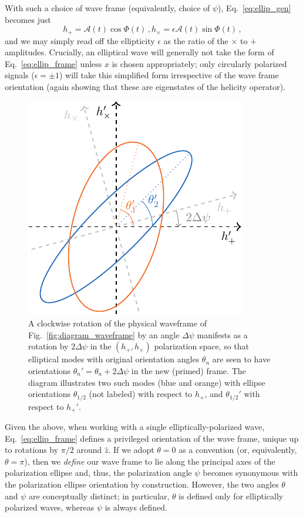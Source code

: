 \documentclass[aps,prd,twocolumn,superscriptaddress,preprintnumbers,floatfix,nofootinbib]{revtex4-2}
\newcommand{\beq}{\begin{equation}}
\newcommand{\eeq}{\end{equation}}
\newcommand*{\eq}[1]{Eq.~\eqref{eq:#1}}
\begin{document}
With such a choice of wave frame (equivalently, choice of $\psi$), \eq{ellip_gen} becomes just
\begin{subequations} \label{eq:ellip_frame}
\beq
h_+ = \mathcal{A}(t) \cos \Phi(t) \, ,
\eeq
\beq
h_\times = \epsilon \mathcal{A}(t) \sin \Phi(t)\, ,
\eeq
\end{subequations}
and we may simply read off the ellipticity $\epsilon$ as the ratio of the $\times$ to $+$ amplitudes.
Crucially, an elliptical wave will generally not take the form of Eq.~\eqref{eq:ellip_frame} unless $\hat{x}$ is chosen appropriately; only circularly polarized signals ($\epsilon=\pm1$) will take  this simplified form irrespective of the wave frame orientation (again showing that these are eigenstates of the helicity operator).

\begin{figure}[tbp]
\includegraphics[width=0.65\columnwidth]{diagram_ellipse_extra.pdf}
\caption{A clockwise rotation of the physical waveframe of Fig.~\ref{fig:diagram_waveframe} by an angle $\Delta\psi$ manifests as a rotation by $2\Delta\psi$ in the $(h_+,h_\times)$ polarization space, so that elliptical modes with original orientation angles $\theta_n$ are seen to have orientations $\theta_n'=\theta_n + 2\Delta\psi$ in the new (primed) frame.
The diagram illustrates two such modes (blue and orange) with ellipse orientations $\theta_{1/2}$ (not labeled) with respect to $h_+$, and  $\theta_{1/2}'$ with respect to $h_+'$.
}
\label{fig:diagram_ellipse_extra}
\end{figure}

Given the above, when working with a single elliptically-polarized wave, Eq.~\eqref{eq:ellip_frame} defines a privileged orientation of the wave frame, unique up to rotations by $\pi/2$ around $\hat{z}$.
If we adopt $\theta =0$ as a convention (or, equivalently, $\theta=\pi$), then we \emph{define} our wave frame to lie along the principal axes of the polarization ellipse and, thus, the polarization angle $\psi$ becomes synonymous with the polarization ellipse orientation by construction.
However, the two angles $\theta$ and $\psi$ are conceptually distinct; in particular, $\theta$ is defined only for elliptically polarized waves, whereas $\psi$ is always defined.
\end{document}
